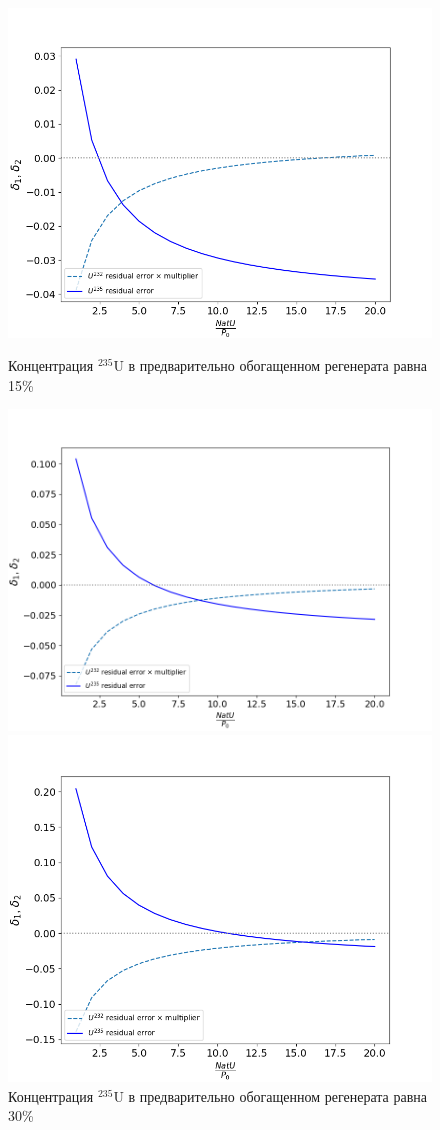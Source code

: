 \begin{figure}[ht]
  \begin{minipage}{.5\textwidth}
    \centering
    \includegraphics[width=.8\linewidth]{images/plots/15}  
    \caption{Концентрация $^{235}$U в предварительно обогащенном регенерата равна 15\%}
  \end{minipage}
  \begin{minipage}{.5\textwidth}
    \centering
    \includegraphics[width=.8\linewidth]{images/plots/30}  
    \caption{Концентрация $^{235}$U в предварительно обогащенном регенерата равна 30\%}
  \end{minipage}
  \begin{minipage}{.5\textwidth}
    \centering
    \includegraphics[width=.8\linewidth]{images/plots/50}  

\end{minipage}
\end{figure}
